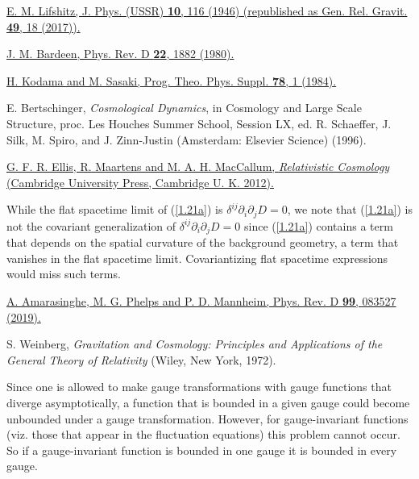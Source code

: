\documentclass[aps,onecolumn,10pt]{revtex4}
\numberwithin{equation}{section}
\numberwithin{equation}{section}
\begin{document}
\begin{thebibliography}{99}




 \href{https://doi.org/10.1007/s10714-016-2165-8}{E. M. Lifshitz, J. Phys. (USSR) {\bf 10}, 116 (1946) (republished as Gen. Rel. Gravit. \textbf{49}, 18  (2017)).}

 \href{https://doi.org/10.1103/PhysRevD.22.1882}{J. M. Bardeen, Phys. Rev. D \textbf{22}, 1882 (1980).}

 \href{https://doi.org/10.1143/PTPS.78.1}{H. Kodama and M. Sasaki, Prog. Theo. Phys. Suppl. {\bf 78}, 1 (1984).}

 E. Bertschinger, {\it Cosmological Dynamics}, in Cosmology and Large Scale Structure, proc. Les Houches Summer School, Session LX, ed. R. Schaeffer, J. Silk, M. Spiro, and J. Zinn-Justin (Amsterdam: Elsevier Science) (1996).

 \href{https://doi.org/10.1017/CBO9781139014403}{G. F. R. Ellis, R. Maartens and  M. A. H. MacCallum, {\it Relativistic Cosmology} (Cambridge University Press,  Cambridge U. K. 2012).}


 While the flat spacetime limit of (\ref{1.21a}) is $\delta^{ij}\partial_i\partial_jD=0$, we note that (\ref{1.21a}) is not the covariant generalization of $\delta^{ij}\partial_i\partial_jD=0$ since (\ref{1.21a}) contains a term that depends on the spatial curvature of the background geometry, a term that vanishes in the flat spacetime limit. Covariantizing flat spacetime expressions would miss such terms.

 \href{https://doi.org/10.1103/PhysRevD.99.083527}{A. Amarasinghe, M. G. Phelps and  P. D. Mannheim, Phys. Rev. D \textbf{99}, 083527 (2019).}


 S. Weinberg, {\it Gravitation and Cosmology:
Principles  and Applications of the General Theory of Relativity} (Wiley, New York, 1972).

 Since one is allowed to make gauge transformations with gauge functions that diverge asymptotically, a function that is bounded in a given gauge could become unbounded under a gauge transformation. However, for gauge-invariant functions (viz. those that appear in the fluctuation equations) this problem cannot occur. So if a gauge-invariant function is bounded in one gauge it is bounded in every gauge. 


\end{thebibliography}
\end{document}
